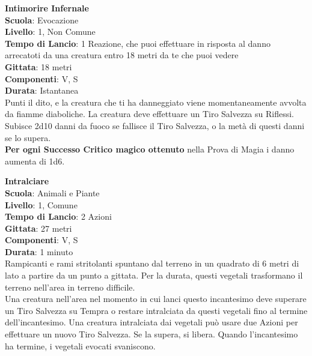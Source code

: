 \begin{multicols}{2}
\medskip\textbf{Intimorire Infernale}\\
\textbf{Scuola}: Evocazione\\
\textbf{Livello}: 1, Non Comune\\
\textbf{Tempo di Lancio}: 1 Reazione, che puoi effettuare in risposta al danno arrecatoti da una creatura entro 18 metri da te che puoi vedere\\
\textbf{Gittata}: 18 metri\\
\textbf{Componenti}: V, S\\
\textbf{Durata}: Istantanea\\
Punti il dito, e la creatura che ti ha danneggiato viene momentaneamente avvolta da fiamme diaboliche. La creatura deve effettuare un Tiro Salvezza su Riflessi. Subisce 2d10 danni da fuoco se fallisce il Tiro Salvezza, o la metà di questi danni se lo supera.\\
\textbf{Per ogni Successo Critico magico ottenuto} nella Prova di Magia i danno aumenta di 1d6.

\medskip\textbf{Intralciare}\\
\textbf{Scuola}: Animali e Piante\\
\textbf{Livello}: 1, Comune\\
\textbf{Tempo di Lancio}: 2 Azioni\\
\textbf{Gittata}: 27 metri\\
\textbf{Componenti}: V, S\\
\textbf{Durata}: 1 minuto\\
Rampicanti e rami stritolanti spuntano dal terreno in un quadrato di 6 metri di lato a partire da un punto a gittata. Per la durata, questi vegetali trasformano il terreno nell'area in terreno difficile.\\
Una creatura nell'area nel momento in cui lanci questo incantesimo deve superare un Tiro Salvezza su Tempra o restare intralciata da questi vegetali fino al termine dell'incantesimo. Una creatura intralciata dai vegetali può usare due Azioni per effettuare un nuovo Tiro Salvezza. Se la supera, si libera. Quando l'incantesimo ha termine, i vegetali evocati svaniscono.


\end{multicols}
